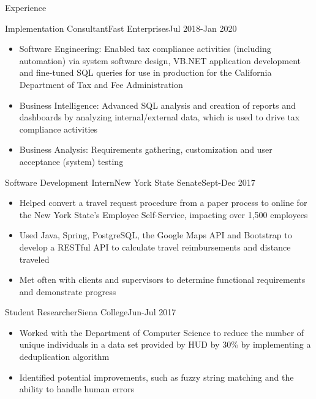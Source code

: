 \documentclass[]{xjavathehutt}
\begin{document}
\makeheader


\begin{cvsection}{Experience}
  \begin{cvsubsection}{Implementation Consultant}{Fast Enterprises}{Jul 2018-Jan 2020}
    \begin{itemize}
      \item{Software Engineering: Enabled tax compliance activities (including automation) via
      system software design, VB.NET application development and fine-tuned SQL queries for use in
    production for the California Department of Tax and Fee Administration}
      \item{Business Intelligence: Advanced SQL analysis and creation of reports and dashboards by analyzing internal/external data, which is used to drive tax compliance activities}
      \item{Business Analysis: Requirements gathering, customization and user acceptance (system) testing}
    \end{itemize}
  \end{cvsubsection}
      
  \begin{cvsubsection}{Software Development Intern}{New York State Senate}{Sept-Dec 2017}
    \begin{itemize}
      \item{Helped convert a travel request procedure from a paper process to online for the New York State's Employee Self-Service, impacting over 1,500 employees}
      \item{Used Java, Spring, PostgreSQL, the Google Maps API and Bootstrap to develop a RESTful API to calculate travel reimbursements and distance traveled}
      \item{Met often with clients and supervisors to determine functional requirements and demonstrate progress}
      \end{itemize}
  \end{cvsubsection}

  \begin{cvsubsection}{Student Researcher}{Siena College}{Jun-Jul 2017}
    \begin{itemize}
      \item{Worked with the Department of Computer Science to reduce the number of unique individuals in a data set provided by HUD by 30\% by implementing a deduplication algorithm}
      \item{Identified potential improvements, such as fuzzy string matching and the ability to handle human errors}
      \end{itemize}
    \end{cvsubsection}
  \end{cvsection}
\end{document}
